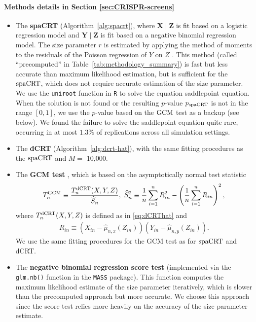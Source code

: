 \documentclass[12pt]{article}
\theoremstyle{definition}
\newcommand{\prx}{\bm X}								%
\newcommand{\srx}{X}									%
\newcommand{\prz}{\bm Z}								%
\newcommand{\srz}{Z}									%
\newcommand{\pry}{{\bm Y}}								%
\newcommand{\sry}{Y}									%
\newcommand{\dCRT}{\textnormal{dCRT}} 					%
\newcommand{\GCM}{\textnormal{GCM}}						%
\newcommand{\spacrt}{\textnormal{spaCRT}}               %
\begin{document}
\paragraph{Methods details in Section \ref{sec:CRISPR-screens}}
\begin{itemize}
  \item The \textbf{spaCRT} (Algorithm~\ref{alg:spacrt}), where $\prx \mid \prz$ is fit based on a logistic regression model and $\pry \mid \prz$ is fit based on a negative binomial regression model. The size parameter $r$ is estimated by applying the method of moments to the residuals of the Poisson regression of $Y$ on $Z$ \citep{Katsevich2020c,Barry2024}. This method (called ``precomputed'' in Table~\ref{tab:methodology_summary}) is fast but less accurate than maximum likelihood estimation, but is sufficient for the $\spacrt$, which does not require accurate estimation of the size parameter. We use the \texttt{uniroot} function in \texttt{R} to solve the equation saddlepoint equation. When the solution is not found or the resulting $p$-value $p_{\spacrt}$ is not in the range $[0,1]$, we use the $p$-value based on the $\GCM$ test as a backup (see below). We found the failure to solve the saddlepoint equation quite rare, occurring in at most $1.3\%$ of replications across all simulation settings.
  \item The \textbf{dCRT} (Algorithm~\ref{alg:dcrt-hat}), with the same fitting procedures as the $\spacrt$ and $M =$ 10,000.
  \item The \textbf{GCM test} \citep{Shah2018}, which is based on the asymptotically normal test statistic
  \begin{align*}
    T_n^{\GCM}\equiv\frac{T_n^{\dCRT}(X,Y,Z)}{\widehat{S}_n},\ \widehat{S}_n^2\equiv \frac{1}{n}\sum_{i=1}^n R_{in}^2-\left(\frac{1}{n}\sum_{i=1}^n R_{in}\right)^2,
  \end{align*}
  where $T_n^{\dCRT}(X,Y,Z)$ is defined as in \eqref{eq:dCRThat} and
  \begin{align*}
    R_{in} \equiv (\srx_{in}-\widehat{\mu}_{n,x}(\srz_{in}))(\sry_{in}-\widehat{\mu}_{n,y}(\srz_{in})).
  \end{align*}
  We use the same fitting procedures for the GCM test as for $\spacrt$ and dCRT.
  \item The \textbf{negative binomial regression score test} (implemented via the \verb|glm.nb()| function in the \verb|MASS| package). This function computes the  maximum likelihood estimate of the size parameter iteratively, which is slower than the precomputed approach but more accurate. We choose this approach since the score test relies more heavily on the accuracy of the size parameter estimate.
  \end{itemize}
\end{document}

